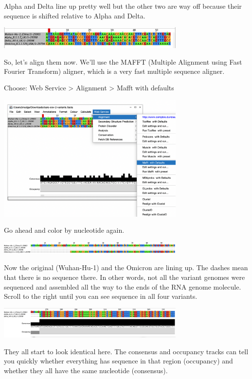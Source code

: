 \documentclass[
]{book}
\begin{document}
Alpha and Delta line up pretty well but the other two are way off because their sequence is shifted relative to Alpha and Delta.

\includegraphics[width=0.7\textwidth,height=\textheight]{./Figures/unaligned.png}

So, let's align them now. We'll use the MAFFT (Multiple Alignment using Fast Fourier Transform) aligner, which is a very fast multiple sequence aligner.

Choose:
Web Service \textgreater{} Alignment \textgreater{} Mafft with defaults

\includegraphics[width=0.7\textwidth,height=\textheight]{./Figures/mafft_jalview.png}

Go ahead and color by nucleotide again.

\includegraphics[width=0.7\textwidth,height=\textheight]{./Figures/aligned.png}

Now the original (Wuhan-Hu-1) and the Omicron are lining up. The dashes mean that there is no sequence there. In other words, not all the variant genomes were sequenced and assembled all the way to the ends of the RNA genome molecule. Scroll to the right until you can see sequence in all four variants.

\includegraphics[width=0.7\textwidth,height=\textheight]{./Figures/consensus.png}

They all start to look identical here. The consensus and occupancy tracks can tell you quickly whether everything has sequence in that region (occupancy) and whether they all have the same nucleotide (consensus).
\end{document}
